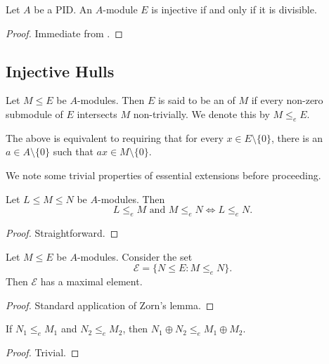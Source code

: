 \begin{corollary}
    Let $A$ be a PID. An $A$-module $E$ is injective if and only if it is divisible.
\end{corollary}
\begin{proof}
    Immediate from .
\end{proof}

\subsection{Injective Hulls}

\begin{definition}
    Let $M\le E$ be $A$-modules. Then $E$ is said to be an  of $M$ if every non-zero submodule of $E$ intersects $M$ non-trivially. We denote this by $M\le_e E$.
\end{definition}
\begin{remark}
    The above is equivalent to requiring that for every $x\in E\setminus\{0\}$, there is an $a\in A\setminus\{0\}$ such that $ax\in M\setminus\{0\}$.
\end{remark}

We note some trivial properties of essential extensions before proceeding.

\begin{proposition}
    Let $L\le M\le N$ be $A$-modules. Then 
    \begin{equation*}
        L\le_e M\text{ and } M\le_e N\iff L\le_e N.
    \end{equation*}
\end{proposition}
\begin{proof}
    Straightforward.
\end{proof}

\begin{proposition}
    Let $M\le E$ be $A$-modules. Consider the set 
    \begin{equation*}
        \mathcal E = \{N\le E\colon M\le_e N\}.
    \end{equation*}
    Then $\mathcal E$ has a maximal element.
\end{proposition}
\begin{proof}
    Standard application of Zorn's lemma.
\end{proof}

\begin{proposition}
    If $N_1\le_e M_1$ and $N_2\le_e M_2$, then $N_1\oplus N_2\le_e M_1\oplus M_2$.
\end{proposition}
\begin{proof}
    Trivial.
\end{proof}

